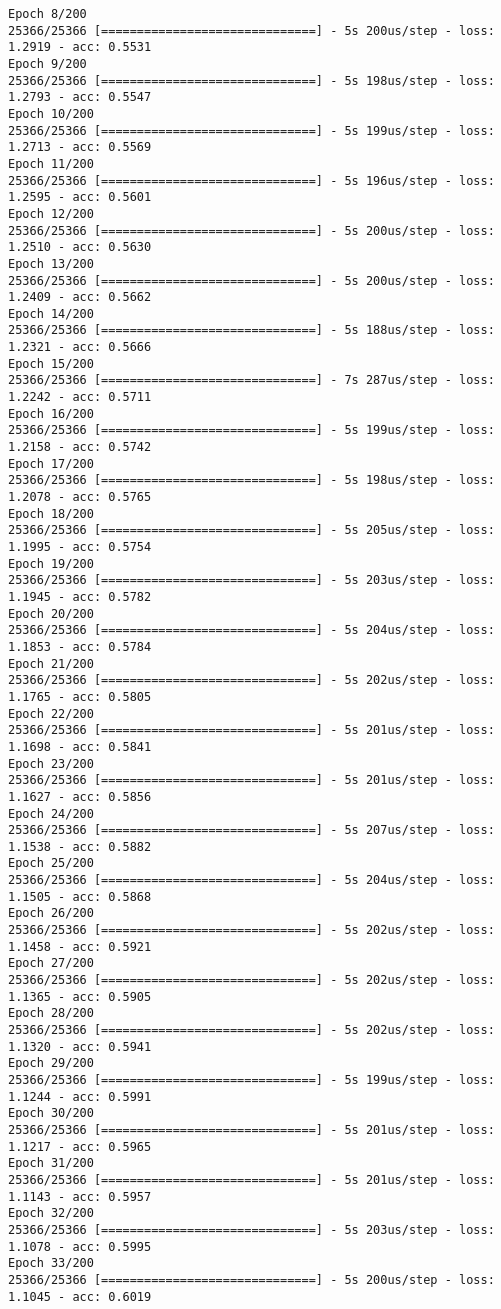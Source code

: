 \documentclass[11pt]{article}
\begin{document}
\begin{Verbatim}[commandchars=\\\{\}]
Epoch 8/200
25366/25366 [==============================] - 5s 200us/step - loss: 1.2919 - acc: 0.5531
Epoch 9/200
25366/25366 [==============================] - 5s 198us/step - loss: 1.2793 - acc: 0.5547
Epoch 10/200
25366/25366 [==============================] - 5s 199us/step - loss: 1.2713 - acc: 0.5569
Epoch 11/200
25366/25366 [==============================] - 5s 196us/step - loss: 1.2595 - acc: 0.5601
Epoch 12/200
25366/25366 [==============================] - 5s 200us/step - loss: 1.2510 - acc: 0.5630
Epoch 13/200
25366/25366 [==============================] - 5s 200us/step - loss: 1.2409 - acc: 0.5662
Epoch 14/200
25366/25366 [==============================] - 5s 188us/step - loss: 1.2321 - acc: 0.5666
Epoch 15/200
25366/25366 [==============================] - 7s 287us/step - loss: 1.2242 - acc: 0.5711
Epoch 16/200
25366/25366 [==============================] - 5s 199us/step - loss: 1.2158 - acc: 0.5742
Epoch 17/200
25366/25366 [==============================] - 5s 198us/step - loss: 1.2078 - acc: 0.5765
Epoch 18/200
25366/25366 [==============================] - 5s 205us/step - loss: 1.1995 - acc: 0.5754
Epoch 19/200
25366/25366 [==============================] - 5s 203us/step - loss: 1.1945 - acc: 0.5782
Epoch 20/200
25366/25366 [==============================] - 5s 204us/step - loss: 1.1853 - acc: 0.5784
Epoch 21/200
25366/25366 [==============================] - 5s 202us/step - loss: 1.1765 - acc: 0.5805
Epoch 22/200
25366/25366 [==============================] - 5s 201us/step - loss: 1.1698 - acc: 0.5841
Epoch 23/200
25366/25366 [==============================] - 5s 201us/step - loss: 1.1627 - acc: 0.5856
Epoch 24/200
25366/25366 [==============================] - 5s 207us/step - loss: 1.1538 - acc: 0.5882
Epoch 25/200
25366/25366 [==============================] - 5s 204us/step - loss: 1.1505 - acc: 0.5868
Epoch 26/200
25366/25366 [==============================] - 5s 202us/step - loss: 1.1458 - acc: 0.5921
Epoch 27/200
25366/25366 [==============================] - 5s 202us/step - loss: 1.1365 - acc: 0.5905
Epoch 28/200
25366/25366 [==============================] - 5s 202us/step - loss: 1.1320 - acc: 0.5941
Epoch 29/200
25366/25366 [==============================] - 5s 199us/step - loss: 1.1244 - acc: 0.5991
Epoch 30/200
25366/25366 [==============================] - 5s 201us/step - loss: 1.1217 - acc: 0.5965
Epoch 31/200
25366/25366 [==============================] - 5s 201us/step - loss: 1.1143 - acc: 0.5957
Epoch 32/200
25366/25366 [==============================] - 5s 203us/step - loss: 1.1078 - acc: 0.5995
Epoch 33/200
25366/25366 [==============================] - 5s 200us/step - loss: 1.1045 - acc: 0.6019

\end{Verbatim}
\end{document}
